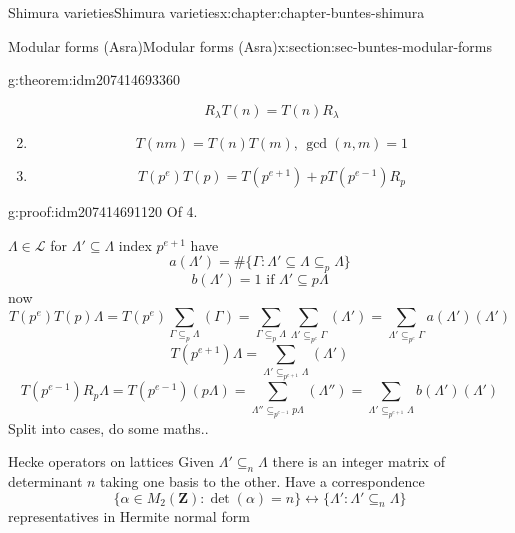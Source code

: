 \documentclass[oneside,10pt,]{book}
\numberwithin{equation}{section}
\newcommand{\ZZ}{\mathbf{Z}}
\begin{document}
\begin{chapterptx}{Shimura varieties}{}{Shimura varieties}{}{}{x:chapter:chapter-buntes-shimura}
\begin{sectionptx}{Modular forms (Asra)}{}{Modular forms (Asra)}{}{}{x:section:sec-buntes-modular-forms}
\begin{theorem}{}{}{g:theorem:idm207414693360}
\begin{enumerate}
\begin{equation*}
R_\lambda T(n) = T(n) R_{\lambda}
\end{equation*}
%
\item{}%
\begin{equation*}
T(nm) = T(n) T(m),\,\gcd(n,m) =1
\end{equation*}
%
\item{}%
\begin{equation*}
T(p^e)T(p) = T(p^{e+1 }) + p T(p^{e-1}) R_p
\end{equation*}
%
\end{enumerate}
%
\end{theorem}
\begin{proofptx}{}{g:proof:idm207414691120}
Of 4.%
\par
\(\Lambda \in \mathcal L\) for \(\Lambda' \subseteq \Lambda \) index \(p^{e+1}\) have%
\begin{equation*}
a(\Lambda')  = \# \{ \Gamma : \Lambda'  \subseteq \Lambda \subseteq_p \Lambda \}
\end{equation*}
%
\begin{equation*}
b(\Lambda')  = 1 \text{ if } \Lambda' \subseteq p\Lambda
\end{equation*}
now%
\begin{equation*}
T(p^e)T(p) \Lambda = T(p^e) \sum_{\Gamma \subseteq_p \Lambda } (\Gamma) = \sum_{\Gamma \subseteq_p \Lambda } \sum_{\Lambda' \subseteq_{p^e} \Gamma} (\Lambda') =\sum_{\Lambda' \subseteq_{p^e} \Gamma}  a(\Lambda') (\Lambda')
\end{equation*}
%
\begin{equation*}
T(p^{e+1} ) \Lambda  =  \sum_{\Lambda'\subseteq_{p^{e+1}} \Lambda} (\Lambda')
\end{equation*}
%
\begin{equation*}
T(p^{e-1} )R_p \Lambda  =  T(p^{e-1}) (p \Lambda) = \sum_{\Lambda'' \subseteq_{p^{e-1}} p\Lambda } (\Lambda'') = \sum_{\Lambda' \subseteq_{p^{e+1}} \Lambda} b(\Lambda') (\Lambda')
\end{equation*}
Split into cases, do some maths..%
\end{proofptx}
Hecke operators on lattices Given \(\Lambda' \subseteq_n \Lambda\) there is an integer matrix of determinant  \(n\) taking one basis to the other. Have a correspondence%
\begin{equation*}
\{ \alpha \in M_2(\ZZ) : \det(\alpha) = n \}  \leftrightarrow \{ \Lambda ' : \Lambda ' \subseteq_n \Lambda\}
\end{equation*}
representatives in Hermite normal form%

\end{sectionptx}
\end{chapterptx}
\end{document}
